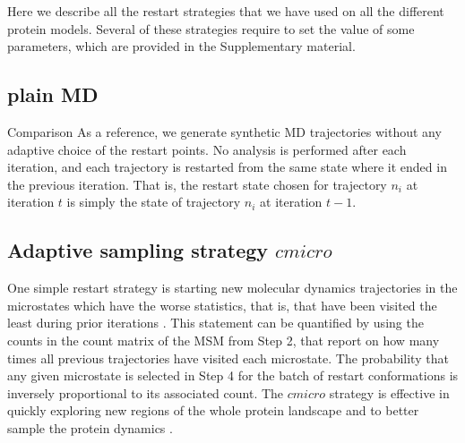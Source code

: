 Here we describe all the restart strategies that we have used on all the
different protein models. Several of these strategies require to set the value
of some parameters, which are provided in the Supplementary material. 

\subsection{plain MD} 

Comparison
As a reference, we generate synthetic MD trajectories without any adaptive
choice of the restart points. No analysis is performed after each
iteration, and each trajectory is restarted from the same state where it
ended in the previous iteration. That is, the restart state chosen for
trajectory $n_i$ at iteration $t$ is simply the state of trajectory $n_i$ at
iteration $t-1$.


\subsection{Adaptive sampling strategy $cmicro$}
One simple restart strategy is starting new molecular dynamics trajectories in
the microstates which have the worse statistics, that is, that have been visited the least during prior iterations
\cite{weber2011characterization, Fabritiis-2014, AdaptivePELE-Lecina2017,
doerr2016htmd}. This statement can be quantified by using the counts in the count matrix of the MSM from Step 2,
that report on how many times all previous trajectories have visited each
microstate.  The probability that any given microstate is selected in Step 4 for
the batch of restart conformations is inversely proportional to its associated count. The $cmicro$ strategy is effective in quickly exploring new regions of the whole protein landscape and to better sample the protein dynamics \cite{Adstrategies2018}.


